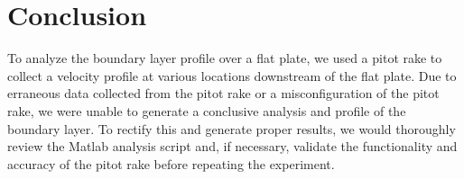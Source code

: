 \chapter{Conclusion}
\label{cp:conclusion}
To analyze the boundary layer profile over a flat plate, we used a pitot rake to collect a velocity profile at various locations downstream of the flat plate. Due to erraneous data collected from the pitot rake or a misconfiguration of the pitot rake, we were unable to generate a conclusive analysis and profile of the boundary layer. To rectify this and generate proper results, we would thoroughly review the Matlab analysis script and, if necessary, validate the functionality and accuracy of the pitot rake before repeating the experiment. 